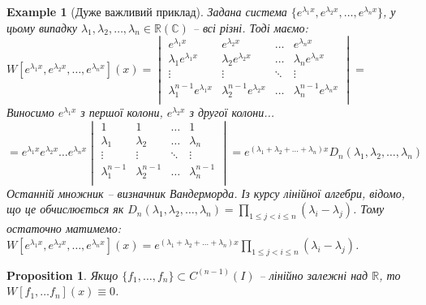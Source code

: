 \documentclass[a4paper, 10pt]{article}
\theoremstyle{theoremdd}
\theoremstyle{theoremdd}
\theoremstyle{theoremdd}
\theoremstyle{theoremdd}
\newtheorem{example}[theorem]{Example}
\theoremstyle{theoremdd}
\newtheorem{proposition}[theorem]{Proposition}
\theoremstyle{theoremdd}
\theoremstyle{theoremdd}
\theoremstyle{theoremdd}
\begin{document}
	\begin{example}[Дуже важливий приклад]
	Задана система $\displaystyle \{e^{\lambda_1 x}, e^{\lambda_2 x}, \dots, e^{\lambda_n x}\}$, у цьому випадку $\lambda_1, \lambda_2, \dots, \lambda_n \in \mathbb{R} (\mathbb{C})$ -- всі різні. Тоді маємо:\\
	$\displaystyle W[e^{\lambda_1 x}, e^{\lambda_2 x}, \dots, e^{\lambda_n x}](x) = 
\begin{vmatrix} 
	e^{\lambda_1 x} &  e^{\lambda_2 x} & \dots & e^{\lambda_n x} \\ 
	\lambda_1 e^{\lambda_1 x} &  \lambda_2 e^{\lambda_2 x} & \dots & \lambda_n e^{\lambda_n x} \\ 
	\vdots &  \vdots & \ddots & \vdots \\
	\lambda_1^{n-1} e^{\lambda_1 x} &  \lambda_2^{n-1} e^{\lambda_2 x} & \dots & \lambda_n^{n-1} e^{\lambda_n x} \\
\end{vmatrix} \boxed{=}$\\
Виносимо $e^{\lambda_1 x}$ з першої колони, $e^{\lambda_2 x}$ з другої колони...\\
$\displaystyle \boxed{=}
e^{\lambda_1 x} e^{\lambda_2 x} \dots e^{\lambda_n x}
\begin{vmatrix} 
	1 &  1 & \dots &  1 \\ 
	\lambda_1 &  \lambda_2 & \dots & \lambda_n \\ 
	\vdots &  \vdots & \ddots & \vdots \\
	\lambda_1^{n-1} &  \lambda_2^{n-1} & \dots & \lambda_n^{n-1} \\
\end{vmatrix} = e^{(\lambda_1+\lambda_2+\dots+\lambda_n)x} D_n(\lambda_1, \lambda_2, \dots, \lambda_n)
$\\
Останній множник -- визначник Вандерморда. Із курсу лінійної алгебри, відомо, що це обчислюється як $\displaystyle D_n(\lambda_1, \lambda_2, \dots, \lambda_n) = \prod_{1 \leq j < i \leq n} (\lambda_i-\lambda_j)$. Тому остаточно матимемо:\\
$\displaystyle W[e^{\lambda_1 x}, e^{\lambda_2 x}, \dots, e^{\lambda_n x}](x) = e^{(\lambda_1+\lambda_2+\dots+\lambda_n)x} \prod_{1 \leq j < i \leq n} (\lambda_i-\lambda_j)$.
\end{example}

	\begin{proposition}
 Якщо $\{f_1, \dots, f_n\} \subset C^{(n-1)}(I)$ -- лінійно залежні над $\mathbb{R}$, то $W[f_1,\dots f_n](x) \equiv 0$.
	\end{proposition}
\end{document}
